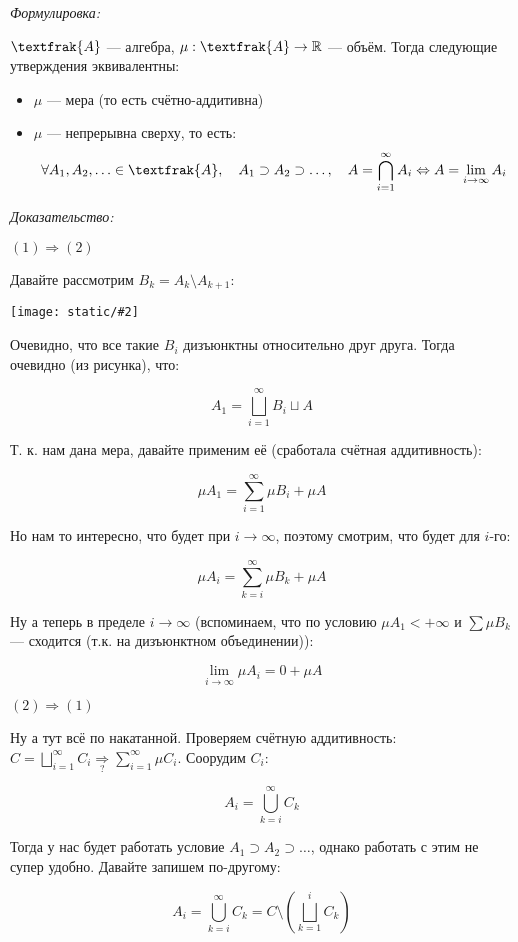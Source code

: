 \documentclass{article}
\def\images#1#2{\begin{center}\texttt{[image: static/\#2]}\end{center}}
\begin{document}
\textit{Формулировка:}

$\textfrak{A}$ --- алгебра, $\mu: \textfrak{A} \rightarrow \mathbb{R}$ --- объём. Тогда следующие утверждения эквивалентны: 

\begin{itemize}
    \item $\mu$ --- мера (то есть счётно-аддитивна)
    \item $\mu$ --- непрерывна сверху, то есть: 
    \[\forall A_1, A_2, \ldots \in \textfrak{A}, \quad A_1 \supset A_2 \supset \ldots, \quad A = \bigcap_{i = 1}^{\infty} A_i \Leftrightarrow A = \lim_{i \rightarrow \infty} A_i\]
\end{itemize}

\textit{Доказательство:}

\textbf{$(1) \Rightarrow (2)$}

Давайте рассмотрим $B_k = A_k \setminus A_{k + 1}$: 

\images{0.3}{nepr_mera_sv.png}

Очевидно, что все такие $B_i$ дизъюнктны относительно друг друга. Тогда очевидно (из рисунка), что:

\[A_1 = \bigsqcup_{i = 1}^{\infty} B_i \sqcup A\]

Т. к. нам дана мера, давайте применим её (сработала счётная аддитивность): 

\[\mu A_1 = \sum_{i = 1}^{\infty} \mu B_i + \mu A\]

Но нам то интересно, что будет при $i \rightarrow \infty$, поэтому смотрим, что будет для $i$-го: 

\[\mu A_i = \sum_{k = i}^{\infty} \mu B_k + \mu A\]

Ну а теперь в пределе $i \rightarrow \infty$ (вспоминаем, что по условию $\mu A_1 < + \infty$ и $\sum \mu B_k$ --- сходится (т.к. на дизъюнктном объединении)):

\[\lim_{i \rightarrow \infty} \mu A_i = 0 + \mu A\]

\textbf{$(2) \Rightarrow (1)$}

Ну а тут всё по накатанной. Проверяем счётную аддитивность: $C = \bigsqcup_{i = 1}^{\infty} C_i \underset{?}{\Rightarrow} \sum_{i = 1}^{\infty} \mu C_i$. Соорудим $C_i$:

\[A_i = \bigcup_{k = i}^{\infty} C_k\]

Тогда у нас будет работать условие $A_1 \supset A_2 \supset \ldots$, однако работать с этим не супер удобно. Давайте запишем по-другому: 

\[A_i = \bigcup_{k = i}^{\infty} C_k = C \setminus \left(\bigsqcup_{k = 1}^{i} C_k\right)\]
\end{document}
